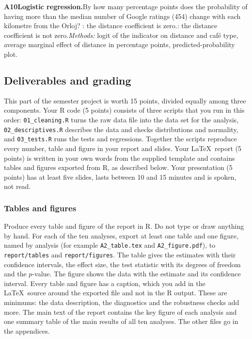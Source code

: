 \documentclass[11pt,a4paper]{article}
\newcommand{\analysis}[6]{%
  \par\smallskip\noindent\textbf{A#1\enspace #2.}\enspace #3\enspace
  \Ho: #4\enspace \Hone: #5\enspace \textit{Methods:} #6\par}
\begin{document}
\analysis{10}{Logistic regression}{By how many percentage points does the probability of having more than the median number of Google ratings (454) change with each kilometre from the Orloj?}{the distance coefficient is zero.}{the distance coefficient is not zero.}{logit of the indicator on distance and caf\'e type, average marginal effect of distance in percentage points, predicted-probability plot.}

\subsection{Deliverables and grading}\label{sec:deliverables}

This part of the semester project is worth 15 points, divided equally among three components. Your R code (5 points) consists of three scripts that you run in this order: \texttt{01\_cleaning.R} turns the raw data file into the data set for the analysis, \texttt{02\_descriptives.R} describes the data and checks distributions and normality, and \texttt{03\_tests.R} runs the tests and regressions. Together the scripts reproduce every number, table and figure in your report and slides. Your \LaTeX\ report (5 points) is written in your own words from the supplied template and contains tables and figures exported from R, as described below. Your presentation (5 points) has at least five slides, lasts between 10 and 15 minutes and is spoken, not read.

\subsubsection*{Tables and figures}

Produce every table and figure of the report in R. Do not type or draw anything by hand. For each of the ten analyses, export at least one table and one figure, named by analysis (for example \texttt{A2\_table.tex} and \texttt{A2\_figure.pdf}), to \texttt{report/tables} and \texttt{report/figures}. The table gives the estimates with their confidence intervals, the effect size, the test statistic with its degrees of freedom and the $p$-value. The figure shows the data with the estimate and its confidence interval. Every table and figure has a caption, which you add in the \LaTeX\ source around the exported file and not in the R output. These are minimums: the data description, the diagnostics and the robustness checks add more. The main text of the report contains the key figure of each analysis and one summary table of the main results of all ten analyses. The other files go in the appendices.
\end{document}
